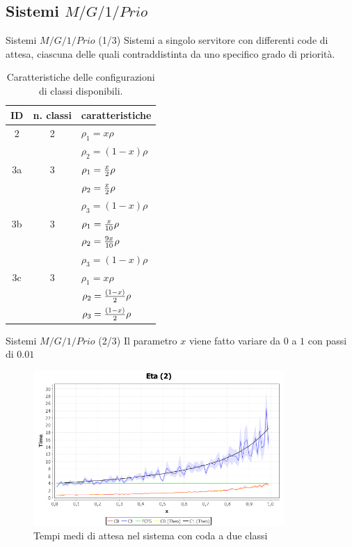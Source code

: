 \documentclass[slidestop,compress,mathserif]{beamer}
\begin{document}
\subsection{Sistemi $M/G/1/Prio$}
\begin{frame}{Sistemi $M/G/1/Prio$ (1/3)}
Sistemi a singolo servitore con differenti code di attesa, ciascuna delle quali contraddistinta da uno specifico grado di priorit\`a. 
\footnotesize
\begin{table}[!h]
	\begin{center}
	\begin{tabular}{|ccl|}
	\hline
	ID  & n. classi & caratteristiche\\
	\hline
	2 & 2 & $\rho_{1}=x\rho$  \\
	& & $\rho_{2}=(1-x)\rho$ \\
	\hline
	3a & 3 & $\rho_{1}={x\over2}\rho$  \\
	& & $\rho_{2}={x\over2}\rho$  \\
	& & $\rho_{3}=(1-x)\rho$  \\
	\hline
	3b & 3 & $\rho_{1}={x\over10}\rho$ \\
	& & $\rho_{2}={9x\over10}\rho$  \\
	& & $\rho_{3}=(1-x)\rho$  \\
	\hline
	3c & 3 & $\rho_{1}=x\rho$ \\
	& & $\rho_{2}={(1-x)\over2}\rho$  \\
	& & $\rho_{3}={(1-x)\over2}\rho$  \\
	\hline
	\end{tabular}
	\end{center}
	\caption{Caratteristiche delle configurazioni di classi disponibili.}
	\label{tab:mg1prioclasses}
\end{table}
\normalsize
\end{frame}

\begin{frame}{Sistemi $M/G/1/Prio$ (2/3)}
Il parametro $x$ viene fatto variare da $0$ a $1$ con passi di $0.01$
\footnotesize
\begin{figure}[!h]{
	\begin{center}
	   \includegraphics[width=0.85\textwidth]{figures/mg1prio2low.png}
	\end{center}}
	\caption{Tempi medi di attesa nel sistema con coda a due classi}
	\label{fig:mg1prio2low}
\end{figure}
\normalsize
\end{frame}
\end{document}
